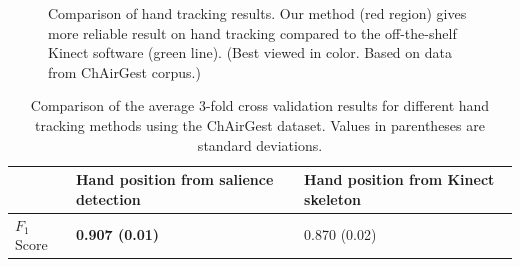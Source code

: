 \begin{figure}
\centering
{}
\caption{Comparison of hand tracking results. Our method (red region) gives more
reliable result on hand tracking compared to the off-the-shelf Kinect software
(green line). (Best viewed in color. Based on data from ChAirGest
corpus.)}
\label{fig:compare-skeleton}
\end{figure}

\begin{table}[h]
\begin{center}
\begin{tabular}{|l|p{5cm}|p{5cm}|}
\hline
 & Hand position from salience detection & Hand position
 from Kinect skeleton \\
\hline
$F_1$ Score & \textbf{0.907 (0.01)} & 0.870 (0.02) \\
\hline
\end{tabular}
\caption{Comparison of the average 3-fold cross validation results for different
hand tracking methods using the ChAirGest dataset. Values in parentheses are
standard deviations.}
\label{tab:comp-tracking}
\end{center}
\end{table}

